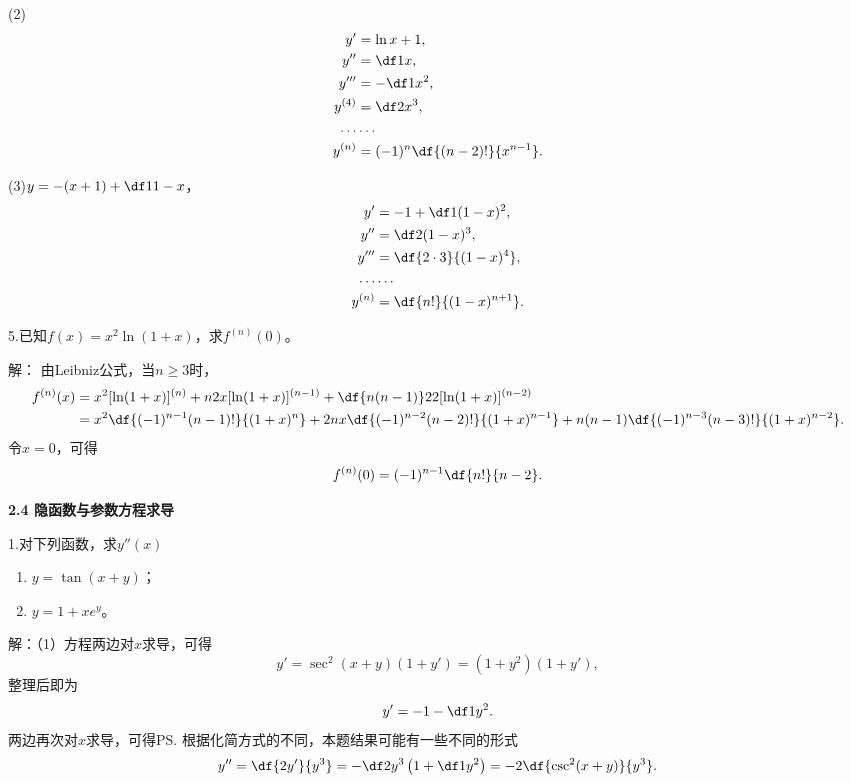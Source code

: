 (2)
\begin{align*}
	y'&=\ln x+1,\\
	y''&=\df1x,\\
	y'''&=-\df1{x^2},\\
	y^{(4)}&=\df2{x^3},\\
	\ldots&\ldots\\
	y^{(n)}&=(-1)^n\df{(n-2)!}{x^{n-1}}.
\end{align*}

(3)$y=-(x+1)+\df1{1-x}$，
\begin{align*}
	y'&=-1+\df1{(1-x)^2},\\
	y''&=\df2{(1-x)^3},\\
	y'''&=\df{2\cdot 3}{(1-x)^4},\\
	\ldots&\ldots\\
	y^{(n)}&=\df{n!}{(1-x)^{n+1}}.
\end{align*}
\fin

\bigskip

5.已知$f(x)=x^2\ln(1+x)$，求$f^{(n)}(0)$。

解：
由Leibniz公式，当$n\geq3$时，
\begin{align*}
	f^{(n)}(x)&=x^2[\ln(1+x)]^{(n)}+n2x[\ln(1+x)]^{(n-1)}
	+\df{n(n-1)}22[\ln(1+x)]^{(n-2)}\\
	&=x^2\df{(-1)^{n-1}(n-1)!}{(1+x)^n}+2nx\df{(-1)^{n-2}(n-2)!}{(1+x)^{n-1}}
	+n(n-1)\df{(-1)^{n-3}(n-3)!}{(1+x)^{n-2}}.
\end{align*}
令$x=0$，可得
$$f^{(n)}(0)=(-1)^{n-1}\df{n!}{n-2}.$$
\fin

\begin{center}
	\bf 2.4 隐函数与参数方程求导
\end{center}

\bigskip

1.对下列函数，求$y''(x)$
  \begin{enumerate}[(1)]
    \setlength{\itemindent}{1cm}
    \item $y=\tan(x+y)$；
    \item $y=1+xe^y$。
  \end{enumerate}

解：（1）方程两边对$x$求导，可得
$$y'=\sec^2(x+y)(1+y')=(1+y^2)(1+y'),$$
整理后即为
$$y'=-1-\df1{y^2}.$$
两边再次对$x$求导，可得\ps{根据化简方式的不同，本题结果可能有一些不同的形式}
$$y''=\df{2y'}{y^3}=-\df2{y^3}\left(1+\df1{y^2}\right)
=-2\df{\csc^2(x+y)}{y^3}.$$

